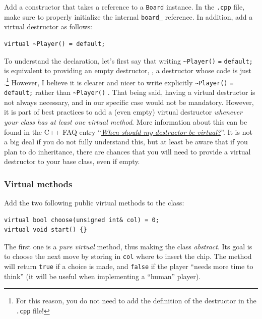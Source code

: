 \documentclass{article}
\begin{document}
Add a constructor that takes a reference to a \texttt{Board} instance. In the \texttt{.cpp} file, make sure to properly initialize the internal \texttt{board\_} reference. In addition, add a virtual destructor as follows:
\begin{center}
\begin{minipage}{.9\textwidth}
\begin{lstlisting}[style=mycpp,numbers=none]
virtual ~Player() = default;
\end{lstlisting}
\end{minipage}
\end{center}
To understand the declaration, let's first say that writing \texttt{\textasciitilde Player()} \texttt{=} \texttt{default;} is equivalent to providing an empty destructor, \ie, a destructor whose code is just \texttt{\string{\string}}.\footnote{For this reason, you do not need to add the definition of the destructor in the \texttt{.cpp} file!} However, I believe it is clearer and nicer to write explicitly \texttt{\textasciitilde Player()} \texttt{=} \texttt{default;} rather than \texttt{\textasciitilde Player()} \texttt{\string{\string}}. That being said, having a virtual destructor is not always necessary, and in our specific case would not be mandatory. However, it is part of best practices to add a (even empty) virtual destructor \emph{whenever your class has at least one virtual method}. More information about this can be found in the C++ FAQ entry ``\href{https://isocpp.org/wiki/faq/virtual-functions#virtual-dtors}{\emph{When should my destructor be virtual?}}''. It is not a big deal if you do not fully understand this, but at least be aware that if you plan to do inheritance, there are chances that you will need to provide a virtual destructor to your base class, even if empty.


\subsubsection{Virtual methods}

Add the two following public virtual methods to the class:
\begin{center}
\begin{minipage}{.9\textwidth}
\begin{lstlisting}[style=mycpp,numbers=none]
virtual bool choose(unsigned int& col) = 0;
virtual void start() {}
\end{lstlisting}
\end{minipage}
\end{center}
The first one is a \emph{pure virtual} method, thus making the class \emph{abstract}. Its goal is to choose the next move by storing in \texttt{col} where to insert the chip. The method will return \texttt{true} if a choice is made, and \texttt{false} if the player ``needs more time to think'' (it will be useful when implementing a ``human'' player).
\end{document}
